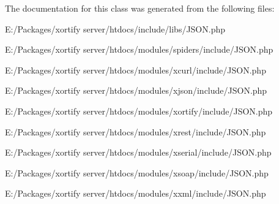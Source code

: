 The documentation for this class was generated from the following files\-:\begin{DoxyCompactItemize}
\item 
E\-:/\-Packages/xortify server/htdocs/include/libs/J\-S\-O\-N.\-php\item 
E\-:/\-Packages/xortify server/htdocs/modules/spiders/include/J\-S\-O\-N.\-php\item 
E\-:/\-Packages/xortify server/htdocs/modules/xcurl/include/J\-S\-O\-N.\-php\item 
E\-:/\-Packages/xortify server/htdocs/modules/xjson/include/J\-S\-O\-N.\-php\item 
E\-:/\-Packages/xortify server/htdocs/modules/xortify/include/J\-S\-O\-N.\-php\item 
E\-:/\-Packages/xortify server/htdocs/modules/xrest/include/J\-S\-O\-N.\-php\item 
E\-:/\-Packages/xortify server/htdocs/modules/xserial/include/J\-S\-O\-N.\-php\item 
E\-:/\-Packages/xortify server/htdocs/modules/xsoap/include/J\-S\-O\-N.\-php\item 
E\-:/\-Packages/xortify server/htdocs/modules/xxml/include/J\-S\-O\-N.\-php\end{DoxyCompactItemize}
